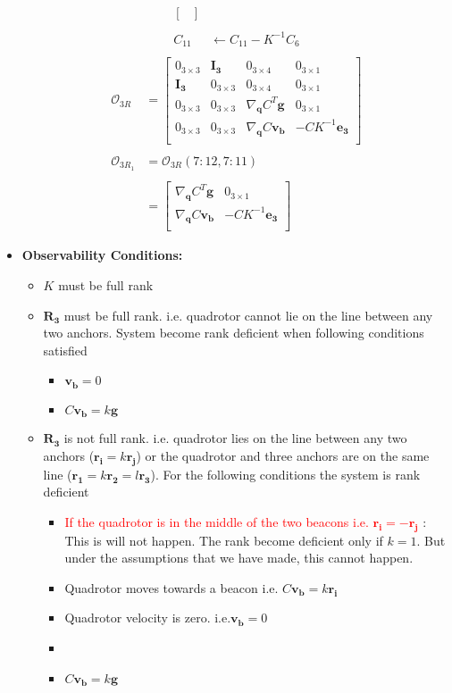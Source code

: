 \documentclass[]{article}
\begin{document}
\begin{itemize}
\begin{align*}
\begin{bmatrix}
	\end{bmatrix}\\
	\\
	C_{11}&\leftarrow C_{11} - K^{-1}C_6\\
	\end{align*}
	\begin{align*}
	\mathcal{O}_{3R} &= \begin{bmatrix}
	0_{3\times 3}& \bm{I_3}& 0_{3\times 4}& 0_{3\times 1}\\
	\bm{I_3} & 0_{3\times 3} & 0_{3\times 4} & 0_{3\times 1}\\
	0_{3\times 3}& 0_{3\times 3}& \nabla_{\bm{q}} C^T\bm{g}& 0_{3\times 1}\\
	0_{3\times 3} & 0_{3\times 3} & \nabla_{\bm{q}} C\bm{v_b} & -CK^{-1}\bm{e_3}\\
	\end{bmatrix}\\
	\\
	\mathcal{O}_{3R_1} &= \mathcal{O}_{3R}(7:12,7:11)\\
	\\
		&= \begin{bmatrix}
			\nabla_{\bm{q}} C^T\bm{g}& 0_{3\times 1}\\
			\nabla_{\bm{q}} C\bm{v_b} & -CK^{-1}\bm{e_3}\\
		\end{bmatrix}
	\end{align*}
	
		\item \textbf{Observability Conditions:}
		\begin{itemize}
			\item $K$ must be full rank
			\item $\bm{R_3}$ must be full rank. i.e. quadrotor cannot lie on the line between any two anchors. System become rank deficient when following conditions satisfied
			\begin{itemize}
				\item $\bm{v_b} = 0$
				\item $C\bm{v_b} = k\bm{g}$
			\end{itemize}
			\item $\bm{R_3}$ is not full rank. i.e. quadrotor lies on the line between any two anchors ($\bm{r_i} = k\bm{r_j}$) or the quadrotor and three anchors are on the same line ($\bm{r_1} = k\bm{r_2} = l\bm{r_3}$). For the following conditions the system is rank deficient
			\begin{itemize}
				\item \textcolor{red}{If the quadrotor is in the middle of the two beacons i.e. $\bm{r_i} = -\bm{r_j}$} : This is will not happen. The rank become deficient only if $k = 1$. But under the assumptions that we have made, this cannot happen.
				\item Quadrotor moves towards a beacon i.e. $C\bm{v_b} = k\bm{r_i}$ 
				\item Quadrotor velocity is zero. i.e.$\bm{v_b} =0$
				\item \item $C\bm{v_b} = k\bm{g}$
			\end{itemize}
		\end{itemize}


\end{itemize}
\end{document}
